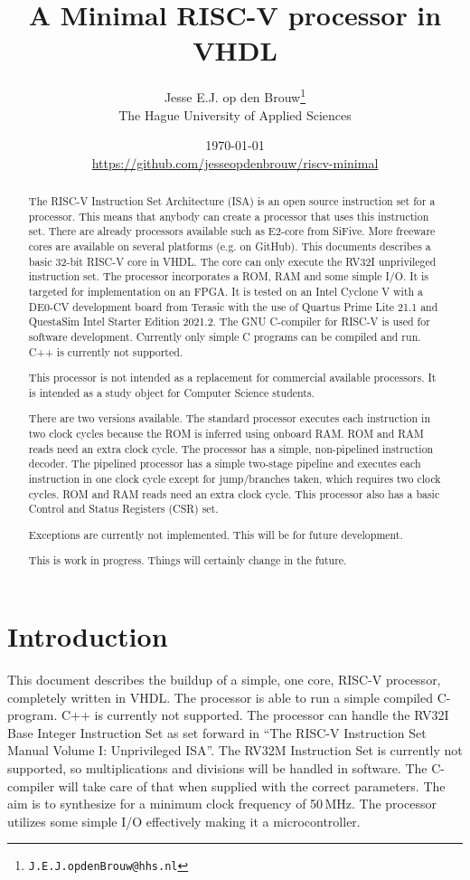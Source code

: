 \documentclass[12pt]{article}
\author{Jesse E.J. op den Brouw\thanks{\texttt{J.E.J.opdenBrouw@hhs.nl}}\\[2ex]The Hague University of Applied Sciences}
\title{A Minimal RISC-V processor in VHDL}
\date{\today\\[2ex]\normalsize\url{https://github.com/jesseopdenbrouw/riscv-minimal}}
\begin{document}
\maketitle

\vfill
\begin{abstract}
\baselineskip
\noindent
The RISC-V Instruction Set Architecture (ISA) is an open source instruction set for a processor. This means that anybody can create a processor that uses this instruction set. There are already processors available such as E2-core from SiFive. More freeware cores are available on several platforms (e.g. on GitHub). This documents describes a basic 32-bit RISC-V core in VHDL. The core can only execute the RV32I unprivileged instruction set. The processor incorporates a ROM, RAM and some simple I/O. It is targeted for implementation on an FPGA. It is tested on an Intel Cyclone V with a DE0-CV development board from Terasic with the use of Quartus Prime Lite 21.1 and QuestaSim Intel Starter Edition 2021.2. The GNU C-compiler for RISC-V is used for software development. Currently only simple C programs can be compiled and run. C++ is currently not supported.

\noindent
This processor is not intended as a replacement for commercial available processors. It is intended as a study object for Computer Science students.

\noindent
There are two versions available. The standard processor executes each instruction in two clock cycles because the ROM is inferred using onboard RAM. ROM and RAM reads need an extra clock cycle. The processor has a simple, non-pipelined instruction decoder. The pipelined processor has a simple two-stage pipeline and executes each instruction in one clock cycle except for jump/branches taken, which requires two clock cycles. ROM and RAM reads need an extra clock cycle. This processor also has a basic Control and Status Registers (CSR) set.

\noindent
Exceptions are currently not implemented. This will be for future development.

\noindent
This is work in progress. Things will certainly change in the future.
\end{abstract}
\vfill

\clearpage
\tableofcontents

\clearpage
\section{Introduction}
This document describes the buildup of a simple, one core, RISC-V processor, completely written in VHDL. The processor is able to run a simple compiled C-program. C++ is currently not supported. The processor can handle the RV32I Base Integer Instruction Set as set forward in ``The RISC-V Instruction Set Manual Volume I: Unprivileged ISA''. The RV32M Instruction Set is currently not supported, so multiplications and divisions will be handled in software. The C-compiler will take care of that when supplied with the correct parameters. The aim is to synthesize for a minimum clock frequency of 50\,MHz. The processor utilizes some simple I/O effectively making it a microcontroller.
\end{document}
